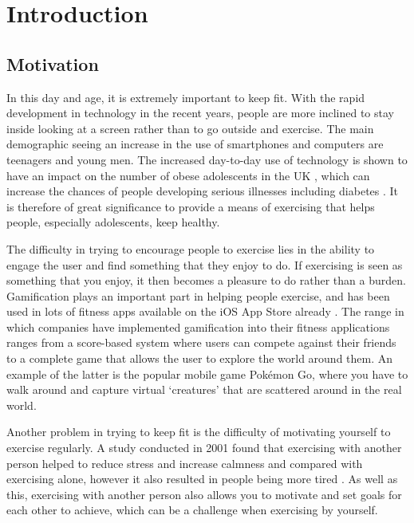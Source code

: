 \chapter{Introduction}

\section{Motivation}


In this day and age, it is extremely important to keep fit. With the rapid development in technology in the recent years, people are more inclined to stay inside looking at a screen rather than to go outside and exercise. The main demographic seeing an increase in the use of smartphones and computers are teenagers and young men. The increased day-to-day use of technology is shown to have an impact on the number of obese adolescents in the UK \cite{Kautiainen2005}, which can increase the chances of people developing serious illnesses including diabetes \cite{Lazar2005}. It is therefore of great significance to provide a means of exercising that helps people, especially adolescents, keep healthy.

The difficulty in trying to encourage people to exercise lies in the ability to engage the user and find something that they enjoy to do. If exercising is seen as something that you enjoy, it then becomes a pleasure to do rather than a burden. Gamification plays an important part in helping people exercise, and has been used in lots of fitness apps available on the iOS App Store already \cite{Lister2014}. The range in which companies have implemented gamification into their fitness applications ranges from a score-based system where users can compete against their friends to a complete game that allows the user to explore the world around them. An example of the latter is the popular mobile game Pok\'{e}mon Go, where you have to walk around and capture virtual `creatures' that are scattered around in the real world.

Another problem in trying to keep fit is the difficulty of motivating yourself to exercise regularly. A study conducted in 2001 found that exercising with another person helped to reduce stress and increase calmness and compared with exercising alone, however it also resulted in people being more tired \cite{Plante2001a}. As well as this, exercising with another person also allows you to motivate and set goals for each other to achieve, which can be a challenge when exercising by yourself.

